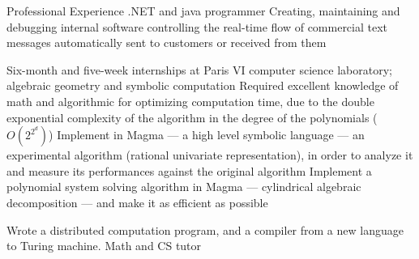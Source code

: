 \begin{rubric}{\color{ForestGreen} Professional Experience}
  .NET and java programmer
  Creating, maintaining and debugging internal software controlling the
  real-time flow of commercial
  text messages automatically sent to customers or received from them


 Six-month and five-week internships at Paris VI computer science laboratory;
 algebraic geometry and symbolic computation
  Required excellent knowledge of math and algorithmic for optimizing
  computation time, due to the double exponential complexity of the
  algorithm in the degree of the polynomials ($O(2^{2^d})$)
  \entry* Implement in Magma --- a high level symbolic language ---
  an experimental
  algorithm (rational univariate representation), in order to analyze it and
  measure its performances against the original algorithm
  \entry* Implement a polynomial system solving algorithm in Magma --- cylindrical algebraic decomposition --- and make it
  as efficient as possible

 Wrote a distributed computation program, and a compiler from a new language to Turing machine.
  Math and CS tutor

\end{rubric}
